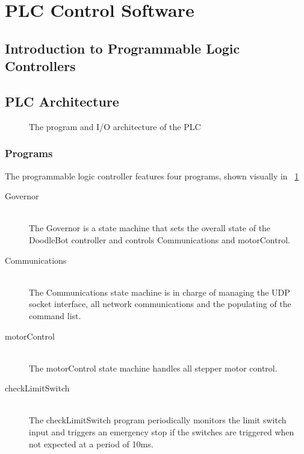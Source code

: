 \section{PLC Control Software}

\subsection{Introduction to Programmable Logic Controllers}

\subsection{PLC Architecture}

	\begin{figure}[htbp!]
		\caption{The program and I/O architecture of the PLC}
		\label{fig:PLCarchitecture}
	\end{figure}

	\subsubsection{Programs}
		The programmable logic controller features four programs, shown visually in ~\ref{fig:PLCarchitecture}
	
		\begin{description}
			\item[Governor] \hfill \\
				The Governor is a  state machine that sets the overall state of the DoodleBot controller and controls Communications and motorControl.
			\item[Communications] \hfill \\
				The Communications state machine is in charge of managing the UDP socket interface, all network communications and the populating of the command list.
			\item[motorControl] \hfill \\
				The motorControl state machine handles all stepper motor control.
			\item[checkLimitSwitch] \hfill \\
				The checkLimitSwitch program periodically monitors the limit switch input and triggers an emergency stop if the switches are triggered when not expected at a period of 10ms.
		\end{description}
		
